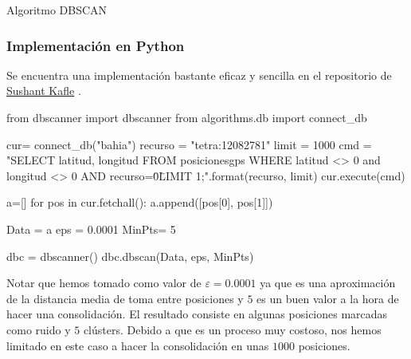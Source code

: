 \documentclass[a4paper, 12pt]{article}
\begin{document}
\begin{algorithm}[H]\label{DBSCAN}
\begin{algorithmic}[1]
		\Else
			\Else
			\EndIf
		
		\EndIf
	\EndFor
\EndFunction
\State{}
			\EndIf
		\EndIf
		\EndIf
	\EndFor
\EndFunction
\State{}
\EndFunction
\end{algorithmic}
\caption{\label{alg:DBSCAN} Algoritmo DBSCAN}
\end{algorithm}

\subsubsection{Implementaci\'on en Python}

Se encuentra una implementaci\'on bastante eficaz y sencilla en el repositorio de \href{https://github.com/SushantKafle/DBSCAN}{Sushant Kafle} \cite{dbscanPython}.\\

\begin{python}
from dbscanner import dbscanner
from algorithms.db import connect_db

cur= connect_db("bahia")
recurso = "tetra:12082781"
limit = 1000
cmd = "SELECT latitud, longitud 
	   FROM posicionesgps 
	   WHERE latitud <> 0 and longitud <> 0 
	   AND recurso=\"{0}\" 
	   LIMIT {1};".format(recurso, limit)
cur.execute(cmd)

a=[]
for pos in cur.fetchall():
    a.append([pos[0], pos[1]])

Data = a
eps = 0.0001
MinPts= 5

dbc = dbscanner()
dbc.dbscan(Data, eps, MinPts)
\end{python}
\bigskip
Notar que hemos tomado como valor de $\varepsilon = 0.0001$ ya que es una aproximaci\'on de la distancia media de toma entre posiciones y $5$ es un buen valor a la hora de hacer una consolidaci\'on. El resultado consiste en algunas posiciones marcadas como ruido y $5$ cl\'usters. Debido a que es un proceso muy costoso, nos hemos limitado en este caso a hacer la consolidaci\'on en unas $1000$ posiciones.\\
\end{document}
